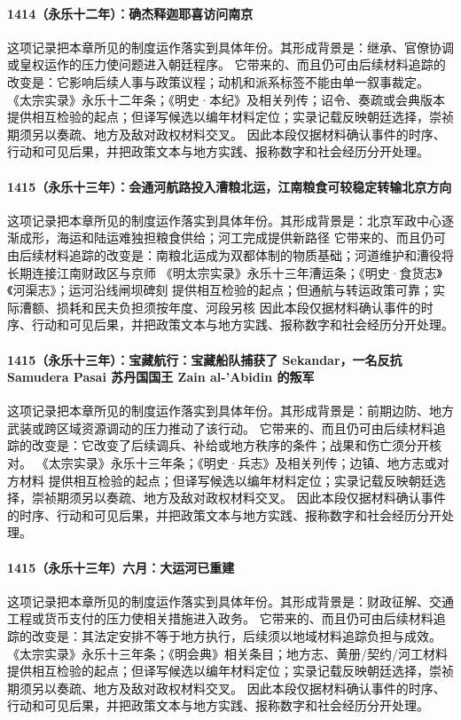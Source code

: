 \paragraph{1414（永乐十二年）：确杰释迦耶喜访问南京} 这项记录把本章所见的制度运作落实到具体年份。其形成背景是：继承、官僚协调或皇权运作的压力使问题进入朝廷程序。 它带来的、而且仍可由后续材料追踪的改变是：它影响后续人事与政策议程；动机和派系标签不能由单一叙事裁定。 《太宗实录》永乐十二年条；《明史·本纪》及相关列传；诏令、奏疏或会典版本 提供相互检验的起点；但译写候选以编年材料定位；实录记载反映朝廷选择，崇祯期须另以奏疏、地方及敌对政权材料交叉。 因此本段仅据材料确认事件的时序、行动和可见后果，并把政策文本与地方实践、报称数字和社会经历分开处理。

\paragraph{1415（永乐十三年）：会通河航路投入漕粮北运，江南粮食可较稳定转输北京方向} 这项记录把本章所见的制度运作落实到具体年份。其形成背景是：北京军政中心逐渐成形，海运和陆运难独担粮食供给；河工完成提供新路径 它带来的、而且仍可由后续材料追踪的改变是：南粮北运成为双都体制的物质基础；河道维护和漕役将长期连接江南财政区与京师 《明太宗实录》永乐十三年漕运条；《明史·食货志》《河渠志》；运河沿线闸坝碑刻 提供相互检验的起点；但通航与转运政策可靠；实际漕额、损耗和民夫负担须按年度、河段另核 因此本段仅据材料确认事件的时序、行动和可见后果，并把政策文本与地方实践、报称数字和社会经历分开处理。

\paragraph{1415（永乐十三年）：宝藏航行：宝藏船队捕获了 Sekandar，一名反抗 Samudera Pasai 苏丹国国王 Zain al-'Abidin 的叛军} 这项记录把本章所见的制度运作落实到具体年份。其形成背景是：前期边防、地方武装或跨区域资源调动的压力推动了该行动。 它带来的、而且仍可由后续材料追踪的改变是：它改变了后续调兵、补给或地方秩序的条件；战果和伤亡须分开核对。 《太宗实录》永乐十三年条；《明史·兵志》及相关列传；边镇、地方志或对方材料 提供相互检验的起点；但译写候选以编年材料定位；实录记载反映朝廷选择，崇祯期须另以奏疏、地方及敌对政权材料交叉。 因此本段仅据材料确认事件的时序、行动和可见后果，并把政策文本与地方实践、报称数字和社会经历分开处理。

\paragraph{1415（永乐十三年）六月：大运河已重建} 这项记录把本章所见的制度运作落实到具体年份。其形成背景是：财政征解、交通工程或货币支付的压力使相关措施进入政务。 它带来的、而且仍可由后续材料追踪的改变是：其法定安排不等于地方执行，后续须以地域材料追踪负担与成效。 《太宗实录》永乐十三年条；《明会典》相关条目；地方志、黄册/契约/河工材料 提供相互检验的起点；但译写候选以编年材料定位；实录记载反映朝廷选择，崇祯期须另以奏疏、地方及敌对政权材料交叉。 因此本段仅据材料确认事件的时序、行动和可见后果，并把政策文本与地方实践、报称数字和社会经历分开处理。

